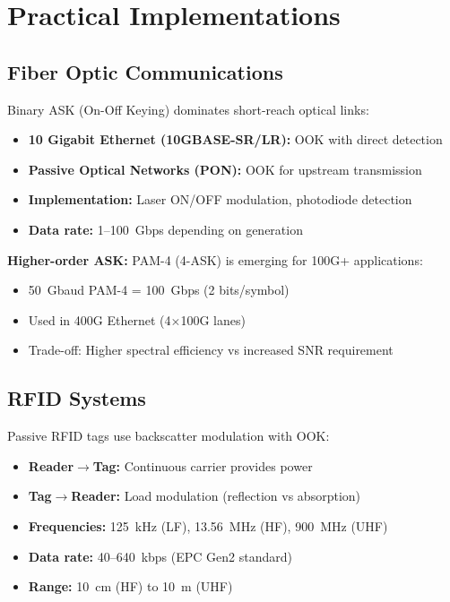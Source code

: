 \section{Practical Implementations}

\subsection{Fiber Optic Communications}

Binary ASK (On-Off Keying) dominates short-reach optical links:

\begin{itemize}
\item \textbf{10 Gigabit Ethernet (10GBASE-SR/LR):} OOK with direct detection
\item \textbf{Passive Optical Networks (PON):} OOK for upstream transmission
\item \textbf{Implementation:} Laser ON/OFF modulation, photodiode detection
\item \textbf{Data rate:} 1--100~Gbps depending on generation
\end{itemize}

\textbf{Higher-order ASK:} PAM-4 (4-ASK) is emerging for 100G+ applications:
\begin{itemize}
\item 50~Gbaud PAM-4 = 100~Gbps (2 bits/symbol)
\item Used in 400G Ethernet (4$\times$100G lanes)
\item Trade-off: Higher spectral efficiency vs increased SNR requirement
\end{itemize}

\subsection{RFID Systems}

Passive RFID tags use backscatter modulation with OOK:

\begin{itemize}
\item \textbf{Reader$\rightarrow$Tag:} Continuous carrier provides power
\item \textbf{Tag$\rightarrow$Reader:} Load modulation (reflection vs absorption)
\item \textbf{Frequencies:} 125~kHz (LF), 13.56~MHz (HF), 900~MHz (UHF)
\item \textbf{Data rate:} 40--640~kbps (EPC Gen2 standard)
\item \textbf{Range:} 10~cm (HF) to 10~m (UHF)
\end{itemize}

